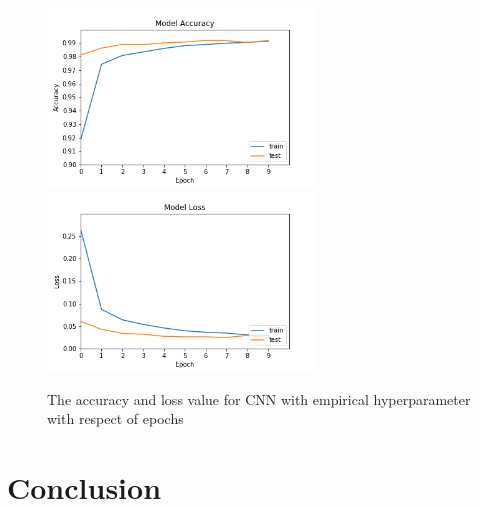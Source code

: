 \documentclass[12pt]{article}
\begin{document}
\begin{figure}
\begin{center}
\includegraphics[width =2.8in]{accuracy.png}
\includegraphics[width =2.8in]{loss.png}
\caption{The accuracy and loss value for CNN with empirical hyperparameter with respect of epochs}
\end{center}
\label{fig:pic8}
\end{figure}
\section{Conclusion}
\end{document}
